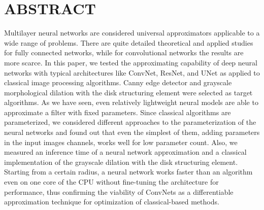 \section*{\textbf{ABSTRACT}}

Multilayer neural networks are considered universal approximators applicable to a wide range of problems. There are quite detailed theoretical and applied studies for fully connected networks, while for convolutional networks the results are more scarce. In this paper, we tested the approximating capability of deep neural networks with typical architectures like ConvNet, ResNet, and UNet as applied to classical image processing algorithms. Canny edge detector and grayscale morphological dilation with the disk structuring element were selected as target algorithms. As we have seen, even relatively lightweight neural models are able to approximate a filter with fixed parameters. Since classical algorithms are parameterized, we considered different approaches to the parameterization of the neural networks and found out that even the simplest of them, adding parameters in the input images channels, works well for low parameter count. Also, we measured an inference time of a neural network approximation and a classical implementation of the grayscale dilation with the disk structuring element. Starting from a certain radius, a neural network works faster than an algorithm even on one core of the CPU without fine-tuning the architecture for performance, thus confirming the viability of ConvNets as a differentiable approximation technique for optimization of classical-based methods.